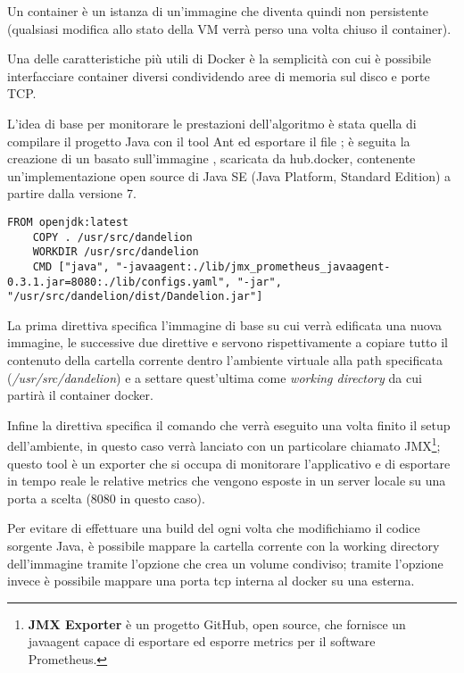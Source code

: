 Un container è un istanza di un'immagine che diventa quindi non persistente (qualsiasi modifica allo stato della VM verrà perso una volta chiuso il container). 

Una delle caratteristiche più utili di Docker è la semplicità con cui è possibile interfacciare container diversi condividendo aree di memoria sul disco e porte TCP.

L'idea di base per monitorare le prestazioni dell'algoritmo è stata quella di compilare il progetto Java con il tool Ant\cite{ant} ed esportare il file ; 
è seguita la creazione di un  basato sull'immagine \cite{open-jdk}, 
scaricata da hub.docker\cite{hub-docker}, contenente un'implementazione open source di Java SE (Java Platform, Standard Edition) a partire dalla versione 7. 

\begin{lstlisting}[style=YmlStyle, caption=Dockerfile]
    FROM openjdk:latest
    COPY . /usr/src/dandelion
    WORKDIR /usr/src/dandelion
    CMD ["java", "-javaagent:./lib/jmx_prometheus_javaagent-0.3.1.jar=8080:./lib/configs.yaml", "-jar", "/usr/src/dandelion/dist/Dandelion.jar"]
\end{lstlisting}

La prima direttiva  specifica l'immagine di base su cui verrà edificata una nuova immagine, le successive due direttive  e  servono rispettivamente a copiare 
tutto il contenuto della cartella corrente dentro l'ambiente virtuale alla path specificata (\textit{/usr/src/dandelion}) e a settare quest'ultima come \textit{working directory} da cui 
partirà il container docker. 

Infine la direttiva  specifica il comando che verrà eseguito una volta finito il setup dell'ambiente, in questo caso verrà lanciato  con un particolare
 chiamato JMX\footnote{
    \textbf{JMX Exporter}\cite{jmx} è un progetto GitHub, open source, che fornisce un javaagent capace di esportare ed esporre metrics per il software 
    Prometheus\cite{prometheus}.
};
questo tool è un exporter che si occupa di monitorare l'applicativo e di esportare in tempo reale le relative metrics che vengono esposte in un server locale su una porta a scelta 
(8080 in questo caso).

Per evitare di effettuare una build del  ogni volta che modifichiamo il codice sorgente Java, è possibile mappare la cartella corrente con la working directory 
dell'immagine tramite l'opzione  che crea un volume condiviso; tramite l'opzione  invece è possibile mappare una porta tcp interna al docker su una esterna.


